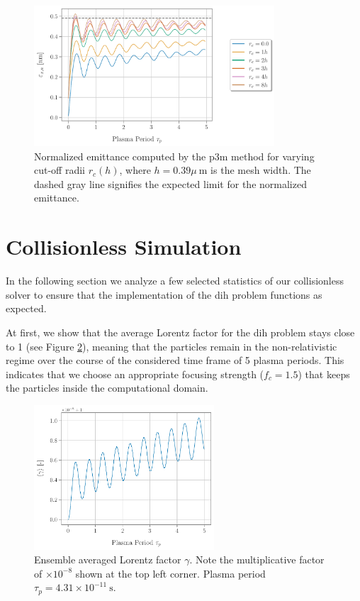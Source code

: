 \begin{figure}
    \begin{center}
        \includegraphics[width=0.80\textwidth]{figures/results/emittance_p3m.pdf}
    \end{center}
    \caption{Normalized emittance computed by the \gls{p3m} method \cite{p3m_ulmer} for varying cut-off radii $r_c(h)$,
    where $h = 0.39 \mu\ \text{m}$ is the mesh width. The dashed gray line signifies the expected limit for the normalized emittance.}
    \label{fig:emittance_p3m}
\end{figure}



\section{Collisionless Simulation}

In the following section we analyze a few selected statistics of our collisionless solver to ensure
that the implementation of the \gls{dih} problem functions as expected.

At first, we show that the average Lorentz factor for the \gls{dih} problem stays close to 1 (see Figure
\ref{fig:gamma_test}), meaning that the particles remain in the non-relativistic regime over the
course of the considered time frame of 5 plasma periods.
This indicates that we choose an appropriate focusing strength ($f_c = 1.5$) that keeps the
particles inside the computational domain.

\begin{figure}
    \begin{center}
        \includegraphics[width=0.60\textwidth]{figures/results/gamma_test.pdf}
    \end{center}
    \caption{Ensemble averaged Lorentz factor $\gamma$. Note the multiplicative factor of $\times
    10^{-8}$ shown at the top left corner. Plasma period $\tau_p = 4.31 \times 10^{-11}\ \text{s}$.}
    \label{fig:gamma_test}
\end{figure}

